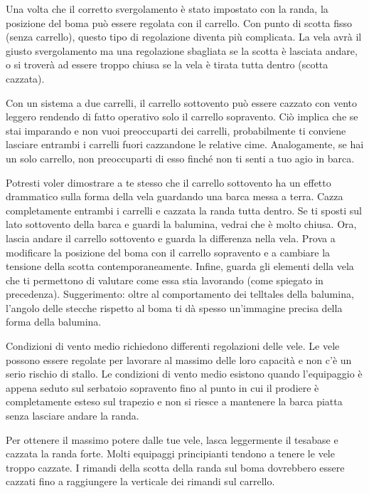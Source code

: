 Una volta che il corretto svergolamento è stato impostato con la randa, la
posizione del boma può essere regolata con il carrello. Con punto di scotta
fisso (senza carrello), questo tipo di regolazione diventa più complicata. La
vela avrà il giusto svergolamento
ma una regolazione sbagliata se la scotta è lasciata andare, o si troverà ad
essere troppo chiusa se la vela è tirata tutta dentro (scotta cazzata).

Con un sistema a due carrelli, il carrello sottovento può essere cazzato con
vento leggero rendendo di fatto operativo solo il carrello sopravento. Ciò
implica che se stai imparando e non vuoi preoccuparti dei carrelli,
probabilmente ti conviene lasciare entrambi i carrelli fuori cazzandone le
relative cime.
Analogamente, se hai un solo carrello, non preoccuparti di esso finché non ti
senti a tuo agio in barca.

Potresti voler dimostrare a te stesso che il carrello sottovento ha un effetto
drammatico sulla forma della vela guardando una barca messa a terra. Cazza completamente
entrambi i carrelli e cazzata la randa tutta dentro. Se ti sposti sul lato
sottovento della barca e guardi la balumina, vedrai che è molto chiusa.
Ora, lascia andare il carrello sottovento e guarda la differenza nella vela.
Prova a modificare la posizione del boma con il carrello sopravento e a cambiare
la tensione della scotta contemporaneamente. Infine, guarda gli elementi della
vela che ti permettono di valutare come essa stia lavorando (come spiegato in
precedenza). Suggerimento: oltre al
comportamento dei telltales della balumina, l'angolo delle stecche rispetto al
boma ti dà spesso un'immagine precisa della forma della balumina.

Condizioni di vento medio richiedono differenti regolazioni delle vele. Le vele
possono essere regolate per lavorare al massimo delle loro capacità e non c'è un
serio rischio di stallo. Le condizioni di vento medio esistono quando
l'equipaggio è appena seduto sul serbatoio sopravento fino al punto in cui il
prodiere è completamente esteso sul trapezio e non si riesce a mantenere la
barca piatta senza lasciare andare la randa.

Per ottenere il massimo potere dalle tue vele, lasca leggermente il tesabase e
cazzata la randa forte. Molti
equipaggi principianti tendono a tenere le vele troppo cazzate. I rimandi della
scotta della randa sul boma dovrebbero essere cazzati fino a raggiungere la
verticale dei rimandi sul carrello.

